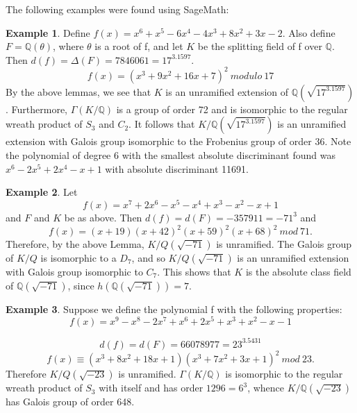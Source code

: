 \documentclass[12pt]{extarticle}
\newcommand{\Q}{\mathbb{Q}}
\newcommand{\<}{\langle}
\renewcommand{\>}{\rangle}
\theoremstyle{definition}
\newtheorem*{example}{Example}
\begin{document}
The following examples were found using SageMath:
\begin{example}
Define $f(x)=x^6 + x^5 - 6x^4 - 4x^3 + 8x^2 + 3x - 2$. Also define $F=\Q(\theta)$, where $\theta$ is a root of f, and let $K$ be the splitting field of f over $\Q$. Then $d(f)=\Delta(F)=7846061=17^3.1597$. 
\begin{equation}
   f(x)= (x^3 + 9x^2 + 16x + 7)^2\:modulo\:17
\end{equation}
By the above lemmas, we see that $K$ is an unramified extension of $\Q(\sqrt{17^3.1597})$. Furthermore, $\Gamma(K/\Q)$ is a group of order 72 and is isomorphic to the regular wreath product of $S_3$ and $C_2$. It follows that $K/\mathbb{Q}(\sqrt{17^3.1597})$ is an unramified extension with Galois group isomorphic to the Frobenius group of order 36.
Note the polynomial of degree 6 with the smallest absolute discriminant found was $x^6 - 2x^5 + 2x^4 - x + 1$ with absolute discriminant 11691.
\end{example}
\begin{example}
 Let \begin{equation}
     f(x)=x^7 + 2x^6 - x^5 - x^4 + x^3 - x^2 - x + 1
 \end{equation}and $F$ and $K$ be as above.
Then $d(f)=d(F)=-357911=-71^{3}$ and
\begin{equation}
    f(x)=(x + 19)(x + 42)^2 (x + 59)^2(x + 68)^2\:mod\:71.
\end{equation}
Therefore, by the above Lemma, $K/Q(\sqrt{-71})$ is unramified. The Galois group of $K/Q$
is isomorphic to a $D_{7}$, and so $K/Q(\sqrt{-71})$
is an unramified extension with Galois group isomorphic to $C_7$.
This shows that $K$ is the absolute class field of $\mathbb{Q}(\sqrt{-71})$, since $h(\Q(\sqrt{-71}))=7$.
\end{example}
\begin{example}
    Suppose we define the polynomial f with the following properties: \begin{equation}
        f(x) =x^9 - x^8 - 2x^7 + x^6 + 2x^5 + x^3 + x^2 - x - 1
    \end{equation} \par
    \begin{equation}
        d(f)=d(F)=66078977=23^3.5431
    \end{equation} 
    \begin{equation}
        f(x)\equiv(x^3 + 8x^2 + 18x + 1)(x^3 + 7x^2 + 3x + 1)^2\:mod\:23.
    \end{equation}
Therefore  $K/Q(\sqrt{-23})$ is unramified. $\Gamma(K/\Q)$ is isomorphic to the regular wreath product of $S_3$ with itself and has order $1296=6^3$, whence $K/\Q(\sqrt{-23})$ has Galois group of order 648.
\end{example}
\end{document}

